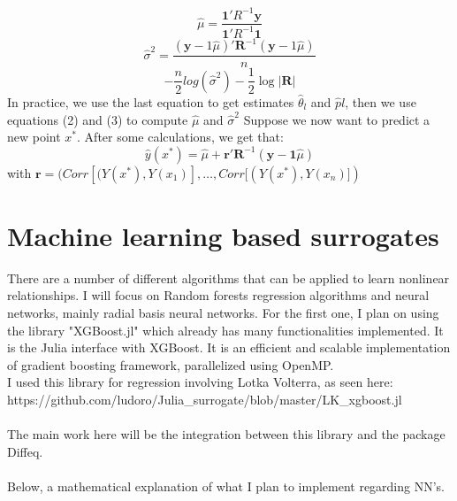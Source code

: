 \documentclass[11pt,a4paper,oneside,titlepage,openright]{book}
\begin{document}
\begin{equation}
\hat \mu = \frac{\mathbf{1}' R^{-1}\mathbf{y}}{\mathbf{1}' R^{-1}\mathbf{1}} 
\end{equation} 
\begin{equation}
\hat \sigma^2 = \frac{(\mathbf{y}-1\hat \mu)'\mathbf{R}^{-1}(\mathbf{y}-1\hat \mu)}{n} 
\end{equation} 
\begin{equation}
-\frac{n}{2}log(\hat \sigma^2) -\frac{1}{2}\log{\vert \mathbf{R} \vert}
\end{equation}
In practice, we use the last equation to get estimates  $\hat \theta_l$ and $\hat pl$, then we use equations (2) and (3) to compute $\hat \mu$ and $\hat \sigma^2$
Suppose we now want to predict a new point $x^*$. After some calculations, we get that: 
\begin{equation}
\hat y(x^*) = \hat \mu + \mathbf{r}' \mathbf{R}^{-1}(\mathbf{y} - \mathbf{1}\hat \mu)
\end{equation}
with $\mathbf{r} = (Corr[(Y(x^*),Y(x_1)], \ldots,Corr[(Y(x^*),Y(x_n)])$



\section*{Machine learning based surrogates}
There are a number of different algorithms that can be applied to learn nonlinear relationships. I will focus on Random forests regression algorithms and neural networks, mainly radial basis neural networks. 
For the first one, I plan on using the library "XGBoost.jl" which already has many functionalities implemented. It is the Julia interface with  XGBoost.  It is an efficient and scalable implementation of gradient boosting framework, parallelized using OpenMP. \\I used this library for regression involving Lotka Volterra, as seen here: https://github.com/ludoro/Julia\_surrogate/blob/master/LK\_xgboost.jl\\\\
The main work here will be the integration between this library and the package Diffeq.\\\\
Below, a mathematical explanation of what I plan to implement regarding NN's.
\end{document}
